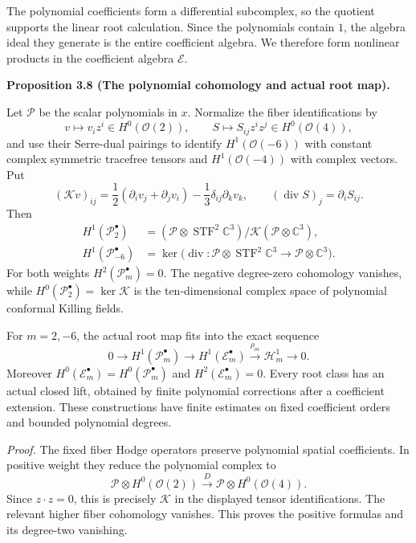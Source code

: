 \documentclass[
  english,
  11pt,
  reqno]{amsart}
\makeatletter
\newcommand{\pandocstatementheading}[1]{%
  \par\if@nobreak\else
    \addpenalty{\@beginparpenalty}%
    \addvspace{.5\baselineskip plus .2\baselineskip minus .2\baselineskip}%
  \fi
  {\normalfont\bfseries #1\par}%
  \nobreak\@afterindenttrue\@afterheading
}
\makeatother
\begin{document}
The polynomial coefficients form a differential subcomplex, so the
quotient supports the linear root calculation. Since the polynomials
contain \(1\), the algebra ideal they generate is the entire coefficient
algebra. We therefore form nonlinear products in the coefficient algebra
\(\mathscr E\).

\pandocstatementheading{\leavevmode{}\label{prop:online-polynomial-cr-cohomology}Proposition 3.8 (The polynomial cohomology and actual root map).}

Let \(\mathcal P\) be the scalar polynomials in \(x\). Normalize the
fiber identifications by \[
v\longmapsto v_i z^i\in H^0(\mathcal O(2)),
\qquad
S\longmapsto S_{ij}z^iz^j\in H^0(\mathcal O(4)),
\] and use their Serre-dual pairings to identify \(H^1(\mathcal O(-6))\)
with constant complex symmetric tracefree tensors and
\(H^1(\mathcal O(-4))\) with complex vectors. Put%
 \[
(\mathcal Kv)_{ij}
=\frac12(\partial_i v_j+\partial_jv_i)
-\frac13\delta_{ij}\partial_kv_k,
\qquad
(\operatorname{div}S)_j=\partial_iS_{ij}.
\] Then%
 \[
\begin{aligned}
H^1(\mathscr P_2^\bullet)
&=(\mathcal P\otimes\operatorname{STF}^2\mathbb C^3)
  /\mathcal K(\mathcal P\otimes\mathbb C^3),\\
H^1(\mathscr P_{-6}^\bullet)
&=\ker\bigl(\operatorname{div}:
\mathcal P\otimes\operatorname{STF}^2\mathbb C^3
\longrightarrow\mathcal P\otimes\mathbb C^3\bigr).
\end{aligned}
\] For both weights \(H^2(\mathscr P_m^\bullet)=0\). The negative
degree-zero cohomology vanishes, while
\(H^0(\mathscr P_2^\bullet)=\ker\mathcal K\) is the ten-dimensional
complex space of polynomial conformal Killing fields.

For \(m=2,-6\), the actual root map fits into the exact sequence%
 \[
0\longrightarrow H^1(\mathscr P_m^\bullet)
\longrightarrow H^1(\mathscr E_m^\bullet)
\xrightarrow{\rho_m}\mathscr H_m^1
\longrightarrow0.
\] Moreover \(H^0(\mathscr E_m^\bullet)=H^0(\mathscr P_m^\bullet)\) and
\(H^2(\mathscr E_m^\bullet)=0\). Every root class has an actual closed
lift, obtained by finite polynomial corrections after a coefficient
extension. These constructions have finite estimates on fixed
coefficient orders and bounded polynomial degrees.

\emph{Proof.} The fixed fiber Hodge operators preserve polynomial
spatial coefficients. In positive weight they reduce the polynomial
complex to \[
\mathcal P\otimes H^0(\mathcal O(2))
\xrightarrow{D}\mathcal P\otimes H^0(\mathcal O(4)).
\] Since \(z\cdot z=0\), this is precisely \(\mathcal K\) in the
displayed tensor identifications. The relevant higher fiber cohomology
vanishes. This proves the positive formulas and its degree-two
vanishing.
\end{document}

